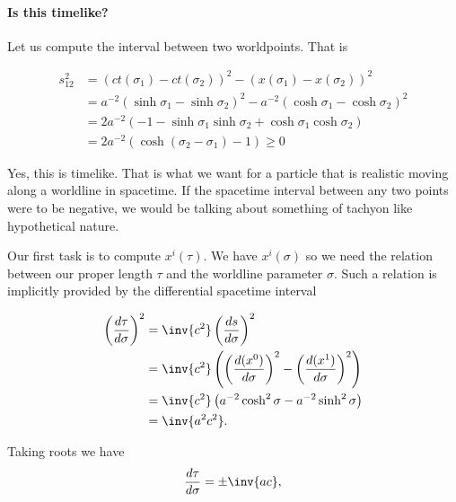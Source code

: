 {\paragraph{Is this timelike?}

Let us compute the interval between two worldpoints.  That is

\begin{equation}\label{eqn:relativisticElectrodynamicsT2:2100}
\begin{aligned}
s_{12}^2
&= (ct(\sigma_1) - ct(\sigma_2))^2 - (x(\sigma_1) - x(\sigma_2))^2  \\
&= a^{-2} (\sinh \sigma_1 - \sinh \sigma_2)^2 - a^{-2} (\cosh\sigma_1 - \cosh\sigma_2)^2 \\
&= 2 a^{-2} \left( -1 - \sinh\sigma_1 \sinh \sigma_2 + \cosh\sigma_1 \cosh\sigma_2 \right) \\
&= 2 a^{-2} \left( \cosh( \sigma_2 - \sigma_1) -1 \right) \ge 0
\end{aligned}
\end{equation}

Yes, this is timelike.  That is what we want for a particle that is realistic moving along a worldline in spacetime.  If the spacetime interval between any two points were to be negative, we would be talking about something of tachyon like hypothetical nature.



Our first task is to compute $x^i(\tau)$.  We have $x^i(\sigma)$ so we need the relation between our proper length $\tau$ and the worldline parameter $\sigma$.  Such a relation is implicitly provided by the differential spacetime interval

\begin{equation}\label{eqn:relativisticElectrodynamicsT2:2120}
\begin{aligned}
\left(\frac{d\tau}{d\sigma}\right)^2
&= \inv{c^2} \left(\frac{ds}{d\sigma}\right)^2 \\
&= \inv{c^2} \left(
\left( \frac{d(x^0)}{d\sigma}\right)^2
-\left( \frac{d(x^1)}{d\sigma}\right)^2
\right) \\
&= \inv{c^2} \left( a^{-2} \cosh^2 \sigma - a^{-2} \sinh^2 \sigma \right) \\
&= \inv{a^2 c^2}.
\end{aligned}
\end{equation}

Taking roots we have
\begin{equation}\label{eqn:relativisticElectrodynamicsT2:50}
\frac{d\tau}{d\sigma} = \pm \inv{a c},
\end{equation}

}
